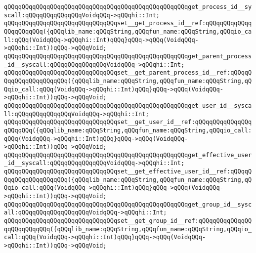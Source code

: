 \newline
\newline
\verb|qQQqqQQqqQQqqQQqqQQqqQQqqQQqqQQqqQQqqQQqqQQqqQQqqQQqget_process_id__syscall:qQQqqQQqqQQqqQQqVoidqQQq->qQQqhi::Int;|\newline
\verb|qQQqqQQqqQQqqQQqqQQqqQQqqQQqqQQqset__get_process_id__ref:qQQqqQQqqQQqqQQqqQQqqQQq({qQQqlib_name:qQQqString,qQQqfun_name:qQQqString,qQQqio_call:qQQq(VoidqQQq->qQQqhi::Int)qQQq}qQQq->qQQq(VoidqQQq->qQQqhi::Int))qQQq->qQQqVoid;|\newline
\newline
\verb|qQQqqQQqqQQqqQQqqQQqqQQqqQQqqQQqqQQqqQQqqQQqqQQqqQQqget_parent_process_id__syscall:qQQqqQQqqQQqqQQqVoidqQQq->qQQqhi::Int;|\newline
\verb|qQQqqQQqqQQqqQQqqQQqqQQqqQQqqQQqset__get_parent_process_id__ref:qQQqqQQqqQQqqQQqqQQqqQQq({qQQqlib_name:qQQqString,qQQqfun_name:qQQqString,qQQqio_call:qQQq(VoidqQQq->qQQqhi::Int)qQQq}qQQq->qQQq(VoidqQQq->qQQqhi::Int))qQQq->qQQqVoid;|\newline
\newline
\verb|qQQqqQQqqQQqqQQqqQQqqQQqqQQqqQQqqQQqqQQqqQQqqQQqqQQqget_user_id__syscall:qQQqqQQqqQQqqQQqVoidqQQq->qQQqhi::Int;|\newline
\verb|qQQqqQQqqQQqqQQqqQQqqQQqqQQqqQQqset__get_user_id__ref:qQQqqQQqqQQqqQQqqQQqqQQq({qQQqlib_name:qQQqString,qQQqfun_name:qQQqString,qQQqio_call:qQQq(VoidqQQq->qQQqhi::Int)qQQq}qQQq->qQQq(VoidqQQq->qQQqhi::Int))qQQq->qQQqVoid;|\newline
\newline
\verb|qQQqqQQqqQQqqQQqqQQqqQQqqQQqqQQqqQQqqQQqqQQqqQQqqQQqget_effective_user_id__syscall:qQQqqQQqqQQqqQQqVoidqQQq->qQQqhi::Int;|\newline
\verb|qQQqqQQqqQQqqQQqqQQqqQQqqQQqqQQqset__get_effective_user_id__ref:qQQqqQQqqQQqqQQqqQQqqQQq({qQQqlib_name:qQQqString,qQQqfun_name:qQQqString,qQQqio_call:qQQq(VoidqQQq->qQQqhi::Int)qQQq}qQQq->qQQq(VoidqQQq->qQQqhi::Int))qQQq->qQQqVoid;|\newline
\newline
\verb|qQQqqQQqqQQqqQQqqQQqqQQqqQQqqQQqqQQqqQQqqQQqqQQqqQQqget_group_id__syscall:qQQqqQQqqQQqqQQqqQQqVoidqQQq->qQQqhi::Int;|\newline
\verb|qQQqqQQqqQQqqQQqqQQqqQQqqQQqqQQqset__get_group_id__ref:qQQqqQQqqQQqqQQqqQQqqQQqqQQq({qQQqlib_name:qQQqString,qQQqfun_name:qQQqString,qQQqio_call:qQQq(VoidqQQq->qQQqhi::Int)qQQq}qQQq->qQQq(VoidqQQq->qQQqhi::Int))qQQq->qQQqVoid;|\newline
\newline
